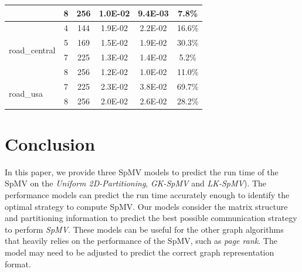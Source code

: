 \documentclass[conference, 10ppt]{IEEEtran}
\begin{document}
\begin{table}[htb]
\begin{tabular}[c]{| l | c | c | c | c | c |}
 &  8  &  256  &  1.0E-02  &  9.4E-03  &  7.8\% \\ \hline
\multirow{4}{*}{road\_central}  &  4  &  144  &  1.9E-02  &  2.2E-02  &  16.6\% \\ \cline{2-6}
 &  5  &  169  &  1.5E-02  &  1.9E-02  &  30.3\% \\ \cline{2-6}
 &  7  &  225  &  1.3E-02  &  1.4E-02  &  5.2\% \\ \cline{2-6}
 &  8  &  256  &  1.2E-02  &  1.0E-02  &  11.0\% \\ \hline
\multirow{2}{*}{road\_usa}  &  7  &  225  &  2.3E-02  &  3.8E-02  &  69.7\% \\ \cline{2-6}
 &  8  &  256  &  2.0E-02  &  2.6E-02  &  28.2\% \\ \hline

\end{tabular}
\end{table}

\section{Conclusion}
In this paper, we provide three SpMV models to predict the run time of the
SpMV on the \textit{Uniform 2D-Partitioning}, \textit{GK-SpMV} and \textit{LK-SpMV}). 
The performance models can predict the run time accurately enough to identify the
optimal strategy to compute SpMV. Our models consider the matrix structure and partitioning information to 
predict the best possible communication strategy to perform
\textit{SpMV}. These models can be useful for the other graph
algorithms that heavily relies on the performance of the SpMV, such as
\textit{page rank}. The model may need to be adjusted to predict the
correct graph representation format.
\end{document}
